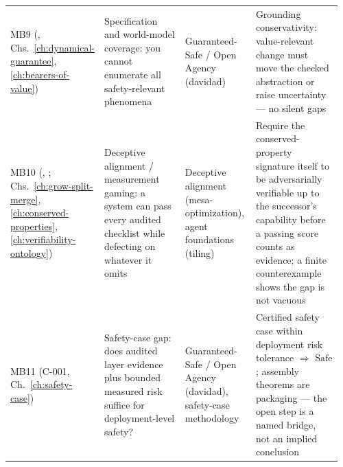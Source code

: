 \begin{landscape}
\begin{longtable}{@{}L{0.14\linewidth}L{0.30\linewidth}L{0.22\linewidth}L{0.30\linewidth}@{}}
MB9 \newline (, Chs.~\ref{ch:dynamical-guarantee}, \ref{ch:bearers-of-value}) & Specification and world-model coverage: you cannot enumerate all safety-relevant phenomena & Guaranteed-Safe / Open Agency (davidad) & Grounding conservativity: value-relevant change must move the checked abstraction or raise uncertainty --- no silent gaps \\
MB10 \newline (, ; Chs.~\ref{ch:grow-split-merge}, \ref{ch:conserved-properties}, \ref{ch:verifiability-ontology}) & Deceptive alignment / measurement gaming: a system can pass every audited checklist while defecting on whatever it omits & Deceptive alignment (mesa-optimization), agent foundations (tiling) & Require the conserved-property signature itself to be adversarially verifiable up to the successor's capability before a passing score counts as evidence; a finite counterexample shows the gap is not vacuous \\
MB11 \newline (C-001, Ch.~\ref{ch:safety-case}) & Safety-case gap: does audited layer evidence plus bounded measured risk suffice for deployment-level safety? & Guaranteed-Safe / Open Agency (davidad), safety-case methodology & Certified safety case within deployment risk tolerance \(\Rightarrow\) \(\mathrm{Safe}\); assembly theorems are packaging --- the open step is a named bridge, not an implied conclusion \\
\end{longtable}
\renewcommand{\arraystretch}{1.0}
\end{landscape}

\authbarneedspace
